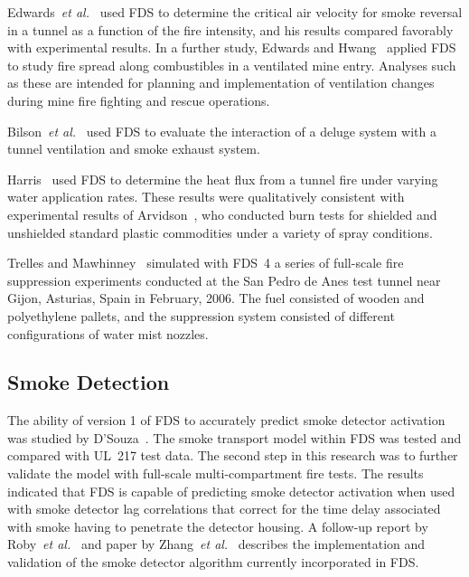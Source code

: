 Edwards~{\em  et al.}~\cite{Edwards:SME2005,Edwards:FSJ}  used  FDS to determine the critical air velocity  for smoke reversal in a tunnel as a
function of  the fire intensity, and his  results compared favorably with   experimental  results.   In  a   further  study,   Edwards  and
Hwang~\cite{Edwards:SME2006}  applied FDS to  study fire  spread along combustibles in  a ventilated mine  entry. Analyses such as  these are
intended for planning and implementation of ventilation changes during mine fire fighting and rescue operations.

Bilson~{\em et al.}~\cite{Bilson:2008} used FDS to evaluate the interaction of a deluge system with a tunnel ventilation and smoke exhaust system.

Harris~\cite{Harris:ISTSS2010} used FDS to determine the heat flux from a tunnel fire under varying water application rates.
These results were qualitatively consistent with experimental results of Arvidson~\cite{Arvidson:ISTSS2010}, who conducted burn tests for shielded and unshielded
standard plastic commodities under a variety of spray conditions.

Trelles and Mawhinney~\cite{Trelles:JFPE2010,Mawhinney:FT2012} simulated with FDS~4 a series of full-scale fire suppression experiments conducted at the
San Pedro de Anes test tunnel near Gijon, Asturias, Spain in February, 2006. The fuel consisted of wooden and polyethylene pallets, and the suppression system
consisted of different configurations of water mist nozzles.




\subsection{Smoke Detection}

The ability of  version 1 of FDS to  accurately predict smoke detector activation was studied by D'Souza~\cite{DSouza:1}. The smoke transport model
within FDS  was tested and compared with UL~217 test data.  The second step  in this research was  to further validate  the model with full-scale
multi-compartment fire tests.  The results  indicated that FDS is capable of predicting  smoke detector activation when used with smoke  detector
lag correlations  that  correct  for  the time  delay associated with smoke having to penetrate the detector housing. A follow-up report by
Roby~{\em et al.}~\cite{CSE_GCR} and paper by
Zhang~{\em et al.}~\cite{Zhang:FSJ2008} describes the implementation and validation of the smoke detector algorithm currently incorporated in FDS.

